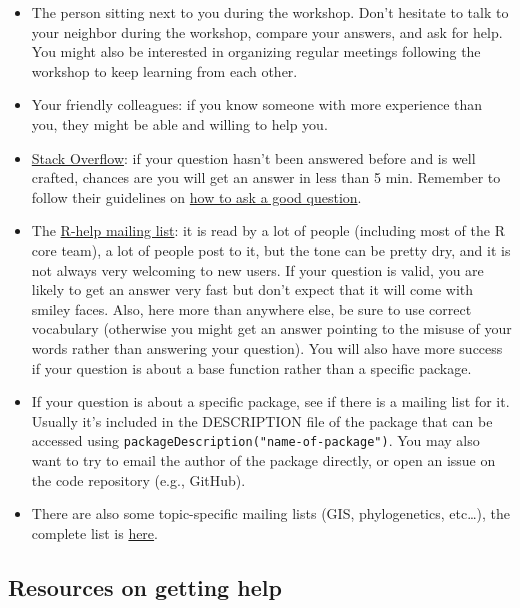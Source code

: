 \documentclass[]{book}
\providecommand{\tightlist}{%
  \setlength{\itemsep}{0pt}\setlength{\parskip}{0pt}}
\theoremstyle{definition}
\theoremstyle{definition}
\theoremstyle{remark}
\begin{document}
\begin{itemize}
\tightlist
\item
  The person sitting next to you during the workshop. Don't hesitate to
  talk to your neighbor during the workshop, compare your answers, and
  ask for help. You might also be interested in organizing regular
  meetings following the workshop to keep learning from each other.
\item
  Your friendly colleagues: if you know someone with more experience
  than you, they might be able and willing to help you.
\item
  \href{http://stackoverflow.com/questions/tagged/r}{Stack Overflow}: if
  your question hasn't been answered before and is well crafted, chances
  are you will get an answer in less than 5 min. Remember to follow
  their guidelines on
  \href{http://stackoverflow.com/help/how-to-ask}{how to ask a good
  question}.
\item
  The \href{https://stat.ethz.ch/mailman/listinfo/r-help}{R-help mailing
  list}: it is read by a lot of people (including most of the R core
  team), a lot of people post to it, but the tone can be pretty dry, and
  it is not always very welcoming to new users. If your question is
  valid, you are likely to get an answer very fast but don't expect that
  it will come with smiley faces. Also, here more than anywhere else, be
  sure to use correct vocabulary (otherwise you might get an answer
  pointing to the misuse of your words rather than answering your
  question). You will also have more success if your question is about a
  base function rather than a specific package.
\item
  If your question is about a specific package, see if there is a
  mailing list for it. Usually it's included in the DESCRIPTION file of
  the package that can be accessed using
  \texttt{packageDescription("name-of-package")}. You may also want to
  try to email the author of the package directly, or open an issue on
  the code repository (e.g., GitHub).
\item
  There are also some topic-specific mailing lists (GIS, phylogenetics,
  etc\ldots{}), the complete list is
  \href{http://www.r-project.org/mail.html}{here}.
\end{itemize}

\subsection{Resources on getting help}\label{resources-on-getting-help}
\end{document}
